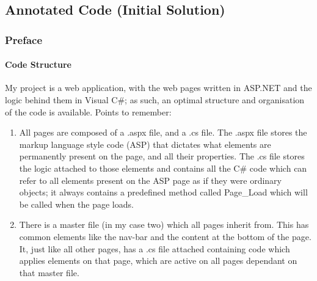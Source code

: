 ﻿\documentclass{article}
\begin{document}
    \subsection{Annotated Code (Initial Solution)}
    \subsubsection{Preface}
    \paragraph{Code Structure}
    My project is a web application, with the web pages written in ASP.NET and the logic behind them in Visual C\#; as such, an optimal structure and organisation of the code is available.
    Points to remember:
    \begin{enumerate}
        \item All pages are composed of a .aspx file, and a .cs file.
        The .aspx file stores the markup language style code (ASP) that dictates what elements are permanently present on the page, and all their properties.
        The .cs file stores the logic attached to those elements and contains all the C\# code which can refer to all elements present on the ASP page as if they were ordinary objects; it always contains a predefined method called Page\_Load which will be called when the page loads.
        \item There is a master file (in my case two) which all pages inherit from.
        This has common elements like the nav-bar and the content at the bottom of the page.
        It, just like all other pages, has a .cs file attached containing code which applies elements on that page, which are active on all pages dependant on that master file.        
    \end{enumerate}
\end{document}
